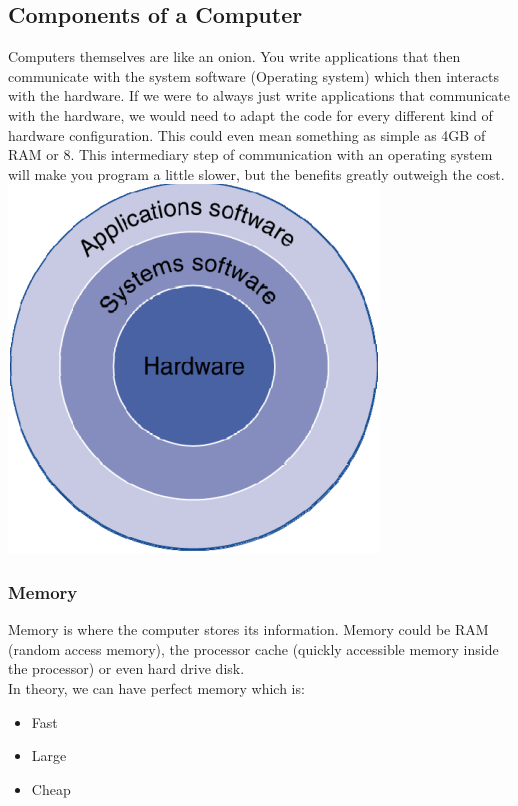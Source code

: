 \documentclass[12pt, twoside, exarticle]{article}
\begin{document}
\subsection{Components of a Computer}

Computers themselves are like an onion.  You write applications that then communicate with the system software (Operating system) which then interacts with the hardware.  If we were to always just write applications that communicate with the hardware, we would need to adapt the code for every different kind of hardware configuration.  This could even mean something as simple as 4GB of RAM or 8.  This intermediary step of communication with an operating system will make you program a little slower, but the benefits greatly outweigh the cost. \\

\includegraphics{graphics/onioncomputer.png}

\subsubsection{Memory}

Memory is where the computer stores its information.  Memory could be RAM (random access memory), the processor cache (quickly accessible memory inside the processor) or even hard drive disk. \\

In theory, we can have perfect memory which is:
\begin{itemize}
\item Fast
\item Large
\item Cheap
\end{itemize}
\end{document}
